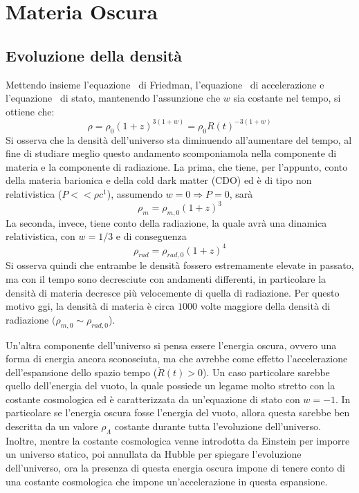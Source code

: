 \section{Materia Oscura}\label{sec:materia-oscura}
\subsection{Evoluzione della densità}\label{sec:evoluazione-densita}
Mettendo insieme l'equazione~ di Friedman, l'equazione~ di accelerazione e l'equazione~ di stato, mantenendo l'assunzione che $w$ sia costante nel tempo, si ottiene che:
\[
    \rho = \rho_0 {(1+z)}^{3(1+w)} = \rho_0 {R(t)}^{-3(1+w)}
\]
Si osserva che la densità dell'universo sta diminuendo all'aumentare del tempo, al fine di studiare meglio questo andamento scomponiamola nella componente di materia e la componente di radiazione. La prima, che tiene, per l'appunto, conto della materia barionica e della cold dark matter (CDO) ed è di tipo non relativistica ($P<<\rho c^1$), assumendo $w = 0 \Rightarrow P=0$, sarà
\[
    \rho_m = \rho_{m,0}{(1+z)}^3
\]
La seconda, invece, tiene conto della radiazione, la quale avrà una dinamica relativistica, con $w = 1/3$ e di conseguenza
\[
    \rho_{rad} = \rho_{rad, 0}{(1+z)}^4
\]
Si osserva quindi che entrambe le densità fossero estremamente elevate in passato, ma con il tempo sono decresciute con andamenti differenti, in particolare la densità di materia decresce più velocemente di quella di radiazione. Per questo motivo ggi, la densità di materia è circa $1000$ volte maggiore della densità di radiazione $(\rho_{m,0} \sim \rho_{rad, 0}$).

Un'altra componente dell'universo si pensa essere l'energia oscura, ovvero una forma di energia ancora sconosciuta, ma che avrebbe come effetto l'accelerazione dell'espansione dello spazio tempo ($\ddot{R}(t)>0$). Un caso particolare sarebbe quello dell'energia del vuoto, la quale possiede un legame molto stretto con la costante cosmologica ed è caratterizzata da un'equazione di stato con $w = -1$. In particolare se l'energia oscura fosse l'energia del vuoto, allora questa sarebbe ben descritta da un valore $\rho_{\Lambda}$ costante durante tutta l'evoluzione dell'universo. Inoltre, mentre la costante cosmologica venne introdotta da Einstein per imporre un universo statico, poi annullata da Hubble per spiegare l'evoluzione dell'universo, ora la presenza di questa energia oscura impone di tenere conto di una costante cosmologica che impone un'accelerazione in questa espansione.

